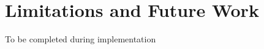 \chapter{Limitations and Future Work} \label{Limitations and Future Work}

To be completed during implementation